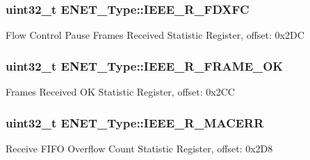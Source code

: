 \subsubsection[{\texorpdfstring{I\+E\+E\+E\+\_\+\+R\+\_\+\+F\+D\+X\+FC}{IEEE_R_FDXFC}}]{ uint32\+\_\+t E\+N\+E\+T\+\_\+\+Type\+::\+I\+E\+E\+E\+\_\+\+R\+\_\+\+F\+D\+X\+FC}\hypertarget{structENET__Type_a2b362535b40637a533d3dc58bec2c41b}{}\label{structENET__Type_a2b362535b40637a533d3dc58bec2c41b}
Flow Control Pause Frames Received Statistic Register, offset\+: 0x2\+DC 
\subsubsection[{\texorpdfstring{I\+E\+E\+E\+\_\+\+R\+\_\+\+F\+R\+A\+M\+E\+\_\+\+OK}{IEEE_R_FRAME_OK}}]{ uint32\+\_\+t E\+N\+E\+T\+\_\+\+Type\+::\+I\+E\+E\+E\+\_\+\+R\+\_\+\+F\+R\+A\+M\+E\+\_\+\+OK}\hypertarget{structENET__Type_acaca53e5f20f5a14db3eda028dc4be6d}{}\label{structENET__Type_acaca53e5f20f5a14db3eda028dc4be6d}
Frames Received OK Statistic Register, offset\+: 0x2\+CC 
\subsubsection[{\texorpdfstring{I\+E\+E\+E\+\_\+\+R\+\_\+\+M\+A\+C\+E\+RR}{IEEE_R_MACERR}}]{ uint32\+\_\+t E\+N\+E\+T\+\_\+\+Type\+::\+I\+E\+E\+E\+\_\+\+R\+\_\+\+M\+A\+C\+E\+RR}\hypertarget{structENET__Type_abb13d85ca55e430221dfa46d1c7fb11f}{}\label{structENET__Type_abb13d85ca55e430221dfa46d1c7fb11f}
Receive F\+I\+FO Overflow Count Statistic Register, offset\+: 0x2\+D8 
